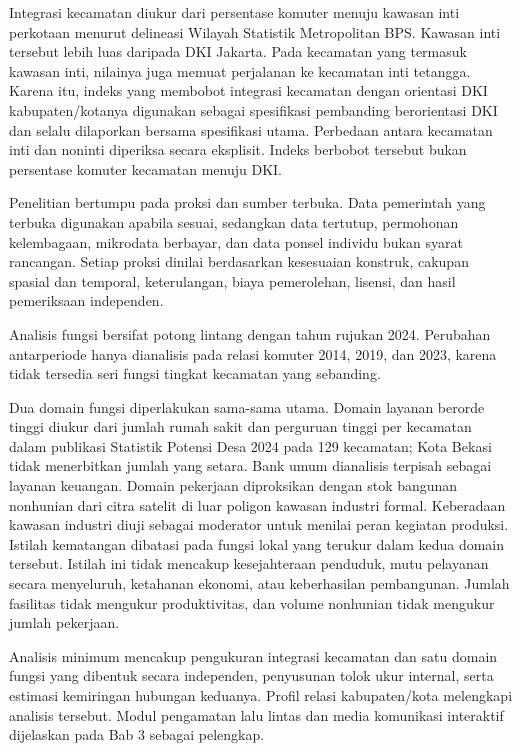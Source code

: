 \documentclass[12pt,a4paper,oneside,openany,indonesian]{report}
\begin{document}
Integrasi kecamatan diukur dari persentase komuter menuju kawasan inti perkotaan menurut delineasi Wilayah Statistik Metropolitan BPS. Kawasan inti tersebut lebih luas daripada DKI Jakarta. Pada kecamatan yang termasuk kawasan inti, nilainya juga memuat perjalanan ke kecamatan inti tetangga. Karena itu, indeks yang membobot integrasi kecamatan dengan orientasi DKI kabupaten/kotanya digunakan sebagai spesifikasi pembanding berorientasi DKI dan selalu dilaporkan bersama spesifikasi utama. Perbedaan antara kecamatan inti dan noninti diperiksa secara eksplisit. Indeks berbobot tersebut bukan persentase komuter kecamatan menuju DKI.

Penelitian bertumpu pada proksi dan sumber terbuka. Data pemerintah yang terbuka digunakan apabila sesuai, sedangkan data tertutup, permohonan kelembagaan, mikrodata berbayar, dan data ponsel individu bukan syarat rancangan. Setiap proksi dinilai berdasarkan kesesuaian konstruk, cakupan spasial dan temporal, keterulangan, biaya pemerolehan, lisensi, dan hasil pemeriksaan independen.

Analisis fungsi bersifat potong lintang dengan tahun rujukan 2024. Perubahan antarperiode hanya dianalisis pada relasi komuter 2014, 2019, dan 2023, karena tidak tersedia seri fungsi tingkat kecamatan yang sebanding.

Dua domain fungsi diperlakukan sama-sama utama. Domain layanan berorde tinggi diukur dari jumlah rumah sakit dan perguruan tinggi per kecamatan dalam publikasi Statistik Potensi Desa 2024 pada 129 kecamatan; Kota Bekasi tidak menerbitkan jumlah yang setara. Bank umum dianalisis terpisah sebagai layanan keuangan. Domain pekerjaan diproksikan dengan stok bangunan nonhunian dari citra satelit di luar poligon kawasan industri formal. Keberadaan kawasan industri diuji sebagai moderator untuk menilai peran kegiatan produksi. Istilah kematangan dibatasi pada fungsi lokal yang terukur dalam kedua domain tersebut. Istilah ini tidak mencakup kesejahteraan penduduk, mutu pelayanan secara menyeluruh, ketahanan ekonomi, atau keberhasilan pembangunan. Jumlah fasilitas tidak mengukur produktivitas, dan volume nonhunian tidak mengukur jumlah pekerjaan.

Analisis minimum mencakup pengukuran integrasi kecamatan dan satu domain fungsi yang dibentuk secara independen, penyusunan tolok ukur internal, serta estimasi kemiringan hubungan keduanya. Profil relasi kabupaten/kota melengkapi analisis tersebut. Modul pengamatan lalu lintas dan media komunikasi interaktif dijelaskan pada Bab 3 sebagai pelengkap.
\end{document}

